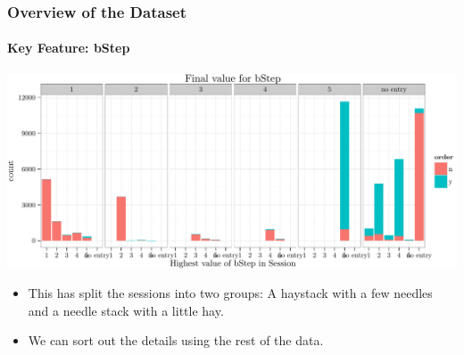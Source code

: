 \documentclass[xcolor=dvipsnames,gray,mathserif]{beamer}
\begin{document}
\begin{frame}
   \frametitle{Overview of the Dataset}
   \framesubtitle{Key Feature: bStep}

      \centerline{\includegraphics[width=.9\linewidth,height=.4\linewidth]{./figs/graphics-bStepPlot.pdf}}

\begin{itemize}
      \item This has split the sessions into two groups: A haystack with a few needles
         and a needle stack with a little hay.

      \item We can sort out the details using the rest of the data.
\end{itemize}
\end{frame}
\end{document}
